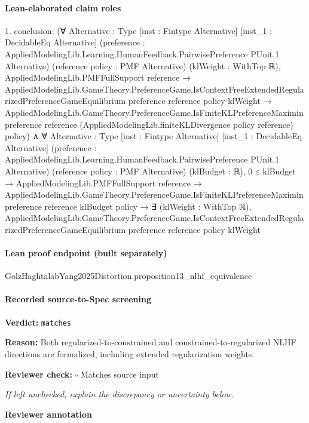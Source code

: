 \documentclass[10pt]{article}
\newcommand{\reviewerbox}{%
  \par\noindent\fbox{\parbox{0.96\linewidth}{\rule{0pt}{0.38in}}}\par
}
\newcommand{\reviewmatch}[1]{%
  \par\noindent\textbf{Reviewer check:} $\square$\; #1\par
  \noindent\emph{If left unchecked, explain the discrepancy or uncertainty below.}\par
}
\begin{document}
\paragraph{Lean-elaborated claim roles}\begin{ReviewVerbatim}
1. conclusion: (∀ {Alternative : Type} [inst : Fintype Alternative] [inst_1 : DecidableEq Alternative]
    (preference : AppliedModelingLib.Learning.HumanFeedback.PairwisePreference PUnit.{1} Alternative)
    (reference policy : PMF Alternative) (klWeight : WithTop ℝ),
    AppliedModelingLib.PMFFullSupport reference →
      AppliedModelingLib.GameTheory.PreferenceGame.IsContextFreeExtendedRegularizedPreferenceGameEquilibrium preference
          reference policy klWeight →
        AppliedModelingLib.GameTheory.PreferenceGame.IsFiniteKLPreferenceMaximin preference reference
          (AppliedModelingLib.finiteKLDivergence policy reference) policy) ∧
  ∀ {Alternative : Type} [inst : Fintype Alternative] [inst_1 : DecidableEq Alternative]
    (preference : AppliedModelingLib.Learning.HumanFeedback.PairwisePreference PUnit.{1} Alternative)
    (reference policy : PMF Alternative) (klBudget : ℝ),
    0 ≤ klBudget →
      AppliedModelingLib.PMFFullSupport reference →
        AppliedModelingLib.GameTheory.PreferenceGame.IsFiniteKLPreferenceMaximin preference reference klBudget policy →
          ∃ (klWeight : WithTop ℝ),
            AppliedModelingLib.GameTheory.PreferenceGame.IsContextFreeExtendedRegularizedPreferenceGameEquilibrium
              preference reference policy klWeight
\end{ReviewVerbatim}

\paragraph{Lean proof endpoint (built separately)}\begin{ReviewVerbatim}
GolzHaghtalabYang2025Distortion.proposition13_nlhf_equivalence
\end{ReviewVerbatim}

\paragraph{Recorded source-to-Spec screening}
\textbf{Verdict:} \texttt{matches}
\\
{\raggedright
\textbf{Reason:} Both regularized-\allowbreak{}to-\allowbreak{}constrained and constrained-\allowbreak{}to-\allowbreak{}regularized NLHF directions are formalized, including extended regularization weights.\allowbreak{}
\par}
\reviewmatch{Matches source input}
\noindent\textbf{Reviewer annotation}\par
\reviewerbox
\clearpage
\hypertarget{source-claim-fd234c18942cf2cc}{}
\end{document}
